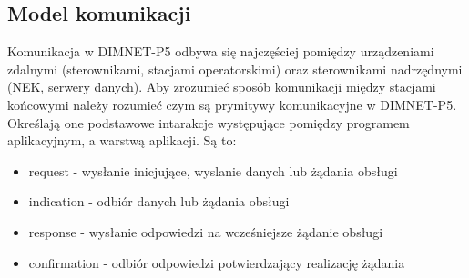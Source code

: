 \subsection{Model komunikacji}
Komunikacja w DIMNET-P5 odbywa się najczęściej pomiędzy urządzeniami zdalnymi (sterownikami, stacjami operatorskimi) oraz sterownikami nadrzędnymi (NEK, serwery danych). Aby zrozumieć sposób komunikacji między stacjami końcowymi należy rozumieć czym są prymitywy komunikacyjne w DIMNET-P5. Określają one podstawowe intarakcje występujące pomiędzy programem aplikacyjnym, a warstwą aplikacji. Są to:
\begin{itemize}
\item request - wysłanie inicjujące, wyslanie danych lub żądania obsługi
\item indication - odbiór danych lub żądania obsługi
\item response - wysłanie odpowiedzi na wcześniejsze żądanie obsługi
\item confirmation - odbiór odpowiedzi potwierdzający realizację żądania
\end{itemize}


